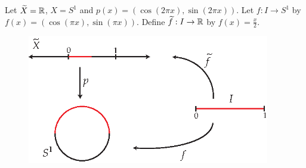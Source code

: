 \begin{example}
Let $\widetilde{X}=\mathbb R$, $X=S^1$ and $p(x)=\left(\cos(2\pi x),\sin(2\pi x)\right)$. Let $f:I\rightarrow S^1$ by $f(x)=\left(\cos(\pi x),\sin(\pi x)\right)$. Define $\widetilde{f}:I\rightarrow \mathbb R$ by $f(x)=\frac{x}{2}$.

\begin{figure}[ht!]
    \centering
    \includegraphics[width=300pt]{images/covering_spaces/s1_lift}
\end{figure}

\end{example}

